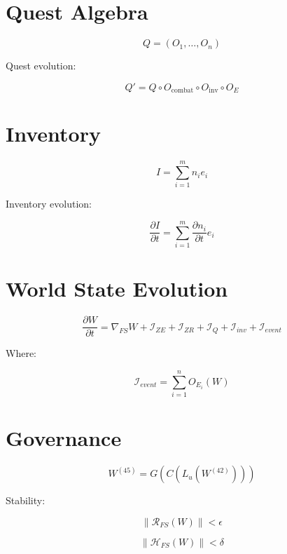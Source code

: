 
\section*{Quest Algebra}

\[
Q = (O_1, \ldots, O_n)
\]

Quest evolution:

\[
Q' = Q \circ O_{\text{combat}} \circ O_{\text{inv}} \circ O_{E}
\]


\section*{Inventory}

\[
I = \sum_{i=1}^{m} n_i e_i
\]

Inventory evolution:

\[
\frac{\partial I}{\partial t}
= \sum_{i=1}^{m} \frac{\partial n_i}{\partial t} e_i
\]


\section*{World State Evolution}

\[
\frac{\partial W}{\partial t}
= \nabla_{FS} W
+ \mathcal{I}_{ZE}
+ \mathcal{I}_{ZR}
+ \mathcal{I}_{Q}
+ \mathcal{I}_{inv}
+ \mathcal{I}_{event}
\]

Where:

\[
\mathcal{I}_{event}
= \sum_{i=1}^{n} O_{E_i}(W)
\]


\section*{Governance}

\[
W^{(45)} = G(C(L_u(W^{(42)})))
\]

Stability:

\[
\|\mathcal{R}_{FS}(W)\| < \epsilon
\]

\[
\|\mathcal{H}_{FS}(W)\| < \delta
\]

